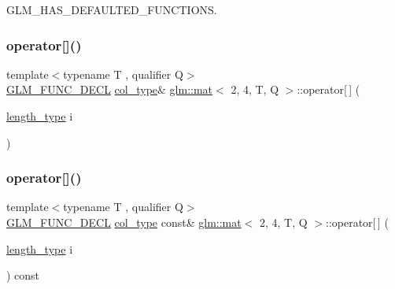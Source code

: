 G\+L\+M\+\_\+\+H\+A\+S\+\_\+\+D\+E\+F\+A\+U\+L\+T\+E\+D\+\_\+\+F\+U\+N\+C\+T\+I\+O\+NS. 

\mbox{\label{structglm_1_1mat_3_012_00_014_00_01_t_00_01_q_01_4_a30332bf17d9c1668fcdc80e301cfe118}} 
\subsubsection{\texorpdfstring{operator[]()}{operator[]()}\hspace{0.1cm}{\footnotesize\ttfamily [1/2]}}
{\footnotesize\ttfamily template$<$typename T , qualifier Q$>$ \\
\hyperlink{setup_8hpp_ab2d052de21a70539923e9bcbf6e83a51}{G\+L\+M\+\_\+\+F\+U\+N\+C\+\_\+\+D\+E\+CL} \hyperlink{structglm_1_1mat_3_012_00_014_00_01_t_00_01_q_01_4_ae14ad10a9d8ce3908ec89ae373a27872}{col\+\_\+type}\& \hyperlink{structglm_1_1mat}{glm\+::mat}$<$ 2, 4, T, Q $>$\+::operator\mbox{[}$\,$\mbox{]} (\begin{DoxyParamCaption}\item[{\hyperlink{structglm_1_1mat_3_012_00_014_00_01_t_00_01_q_01_4_a5295c484627e965d615f3367c2ca45d8}{length\+\_\+type}}]{i }\end{DoxyParamCaption})}

\mbox{\label{structglm_1_1mat_3_012_00_014_00_01_t_00_01_q_01_4_af5ccda8342646f7dea9fec3ed9088607}} 
\subsubsection{\texorpdfstring{operator[]()}{operator[]()}\hspace{0.1cm}{\footnotesize\ttfamily [2/2]}}
{\footnotesize\ttfamily template$<$typename T , qualifier Q$>$ \\
\hyperlink{setup_8hpp_ab2d052de21a70539923e9bcbf6e83a51}{G\+L\+M\+\_\+\+F\+U\+N\+C\+\_\+\+D\+E\+CL} \hyperlink{structglm_1_1mat_3_012_00_014_00_01_t_00_01_q_01_4_ae14ad10a9d8ce3908ec89ae373a27872}{col\+\_\+type} const\& \hyperlink{structglm_1_1mat}{glm\+::mat}$<$ 2, 4, T, Q $>$\+::operator\mbox{[}$\,$\mbox{]} (\begin{DoxyParamCaption}\item[{\hyperlink{structglm_1_1mat_3_012_00_014_00_01_t_00_01_q_01_4_a5295c484627e965d615f3367c2ca45d8}{length\+\_\+type}}]{i }\end{DoxyParamCaption}) const}



